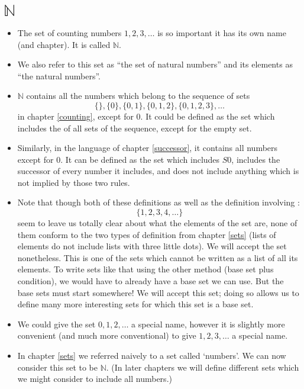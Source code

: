 \chapter{$\mathbb{N}$}
\label{n}

\begin{itemize}
\item
The set of counting numbers $1, 2, 3, \ldots$ is so important it has its own name (and chapter). It is called $\mathbb{N}$.
\item
We also refer to this set as ``the set of natural numbers'' and its elements as ``the natural numbers''.
\item
$\mathbb{N}$ contains all the numbers which belong to the sequence of sets 
\[ \{\}, \{0\}, \{0, 1\}, \{0,1,2\}, \{0, 1,2,3\}, \ldots \]
in chapter \ref{counting}, except for $0$. It could be defined as the set which includes the  of all sets of the sequence, except for the empty set.
\item
Similarly, in the language of chapter \ref{successor}, it contains all numbers except for $0$. It can be defined as the set which includes $S0$, includes the successor of every number it includes, and does not include anything which is not implied by those two rules.
\item
Note that though both of these definitions as well as the definition involving : 
\[ \{1, 2, 3, 4, \ldots \} \]
seem to leave us totally clear about what the elements of the set are, none of them conform to the two types of definition from chapter \ref{sets} (lists of elements do not include lists with three little dots). We will accept the set nonetheless. This is one of the sets which cannot be written as a list of all its elements. To write sets like that using the other method (base set plus condition), we would have to already have a base set we can use. But the base sets must start somewhere! We will accept this set; doing so allows us to define many more interesting sets for which this set is a base set. 
\item
We could give the set $0, 1, 2, \ldots$ a special name, however it is slightly more convenient (and much more conventional) to give $1, 2, 3, \ldots$ a special name.
\item
In chapter \ref{sets} we referred naively to a set called `numbers'. We can now consider this set to be $\mathbb{N}$. (In later chapters we will define different sets which we might consider to include all numbers.)
\end{itemize}
